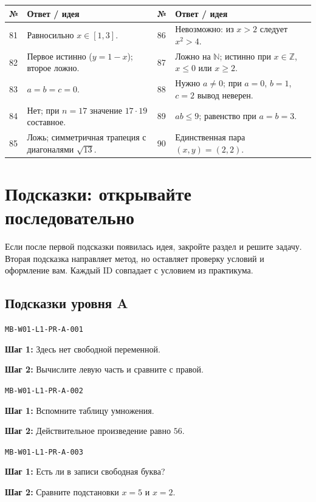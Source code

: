 \documentclass[11pt,a4paper,openany]{book}
\newcommand{\muid}[1]{\texttt{\footnotesize #1}}
\begin{document}
\begin{tabularx}{\textwidth}{@{}p{10mm}X p{10mm}X@{}}\toprule № & Ответ / идея & № & Ответ / идея\\\midrule

81 & Равносильно $x\in[1,3]$. & 86 & Невозможно: из $x>2$ следует $x^2>4$.\\

82 & Первое истинно ($y=1-x$); второе ложно. & 87 & Ложно на $\mathbb N$; истинно при $x\in\mathbb Z$, $x\le0$ или $x\ge2$.\\

83 & $a=b=c=0$. & 88 & Нужно $a\ne0$; при $a=0$, $b=1$, $c=2$ вывод неверен.\\

84 & Нет; при $n=17$ значение $17\cdot19$ составное. & 89 & $ab\le9$; равенство при $a=b=3$.\\

85 & Ложь; симметричная трапеция с диагоналями $\sqrt{13}$. & 90 & Единственная пара $(x,y)=(2,2)$.\\

\bottomrule\end{tabularx}\endgroup

\chapter{Подсказки: открывайте последовательно}
\begin{learnbox}Если после первой подсказки появилась идея, закройте раздел и решите задачу. Вторая подсказка направляет метод, но оставляет проверку условий и оформление вам. Каждый ID совпадает с условием из практикума.\end{learnbox}

\section{Подсказки уровня A}

\noindent\muid{MB-W01-L1-PR-A-001}\par 
\textbf{Шаг 1:} Здесь нет свободной переменной.\par \textbf{Шаг 2:} Вычислите левую часть и сравните с правой.\smallskip

\noindent\muid{MB-W01-L1-PR-A-002}\par 
\textbf{Шаг 1:} Вспомните таблицу умножения.\par \textbf{Шаг 2:} Действительное произведение равно $56$.\smallskip

\noindent\muid{MB-W01-L1-PR-A-003}\par 
\textbf{Шаг 1:} Есть ли в записи свободная буква?\par \textbf{Шаг 2:} Сравните подстановки $x=5$ и $x=2$.\smallskip
\end{document}
